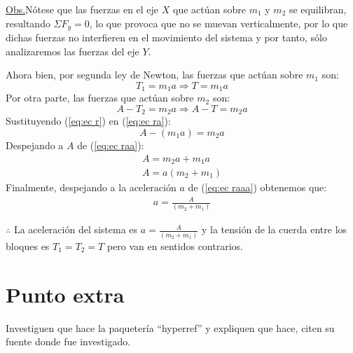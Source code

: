 \documentclass[letterpaper,12pt]{article}
\begin{document}
\begin{enumerate}
\underline{Obs.}Nótese que las fuerzas en el eje $X$ que actúan sobre $m_1$ y $m_2$ se equilibran, resultando $\Sigma F_y=0$, lo que provoca que no se muevan verticalmente, por lo que dichas fuerzas no interfieren en el movimiento del sistema y por tanto, sólo analizaremos las fuerzas del eje $Y$.

Ahora bien, por segunda ley de Newton, las fuerzas que actúan sobre $m_1$ son:
    \begin{equation}\tag{i}
        T_1 = m_{1}a \Longrightarrow T= m_{1}a 
        \label{eq:ec r}
    \end{equation}
Por otra parte, las fuerzas que actúan sobre $m_2$ son:
    \begin{equation}\tag{ii}
        A - T_2 = m_{2}a \Longrightarrow A-T= m_{2}a 
        \label{eq:ec ra}
    \end{equation}
Sustituyendo (\ref{eq:ec r}) en (\ref{eq:ec ra}):
    \begin{equation}\tag{iii}
        A - (m_{1}a)  = m_{2}a 
        \label{eq:ec raa}
    \end{equation}
Despejando a $A$ de (\ref{eq:ec raa}):
    \begin{align*}
        A = m_{2}a + m_{1}a\\
        A = a(m_{2} + m_{1}) \tag{iv}
        \label{eq:ec raaa}
    \end{align*}
Finalmente, despejando a la aceleración $a$ de (\ref{eq:ec raaa}) obtenemos que:
    \begin{align*}
        a=\frac{A}{(m_{2} + m_{1})}
        \label{eq:ec raaa}
    \end{align*}
    \begin{center}
        $\therefore$ La  aceleración del sistema  es $ a=\frac{A}{(m_{2} + m_{1})}$ y la tensión de la cuerda entre los bloques es $T_1= T_2 =T$ pero van en sentidos contrarios.
    \end{center}

    
    
\end{enumerate}



\section*{Punto extra}
Investiguen que hace la paquetería ``hyperref'' y expliquen que hace, citen su fuente donde fue investigado.
\end{document}
